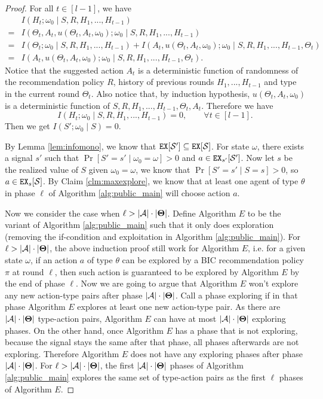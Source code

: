 \begin{proof}
For all $t \in [l-1]$, we have
\begin{align*}
&I(H_t; \omega_0\mid S,R,H_1,...,H_{t-1}) \\
=& I(\Theta_t, A_t, u(\Theta_t, A_t, \omega_0); \omega_0\mid S,R,H_1,...,H_{t-1}) \\
=& I(\Theta_t ; \omega_0\mid S,R,H_1,...,H_{t-1}) +  I(A_t, u(\Theta_t, A_t, \omega_0); \omega_0\mid S,R,H_1,...,H_{t-1},\Theta_t) \\
=& I(A_t, u(\Theta_t, A_t, \omega_0); \omega_0\mid S,R,H_1,...,H_{t-1},\Theta_t).
\end{align*}
Notice that the suggested action $A_t$ is a deterministic function of randomness of the recommendation policy $R$,  history of previous rounds $H_1,...,H_{t-1}$ and type in the current round $\Theta_t$. Also notice that, by induction hypothesis, $u(\Theta_t, A_t, \omega_0)$ is a deterministic function of $S,R,H_1,...,H_{t-1},\Theta_t, A_t$. Therefore we have
\[
I(H_t; \omega_0\mid S,R,H_1,...,H_{t-1}) = 0, \qquad \forall t \in [l-1].
\]
Then we get
$ I(S'; \omega_0 \mid  S) = 0.$

By Lemma \ref{lem:infomono}, we know that $\mathtt{EX}[\mathcal{S}'] \subseteq \mathtt{EX}[\mathcal{S}]$. For state $\omega$, there exists a signal $s'$ such that $\Pr[S'=s'\mid \omega_0 =\omega] >0 $ and $a \in \mathtt{EX}_{s'} [\mathcal{S}']$. Now let $s$ be the realized value of $S$ given $\omega_0 = \omega$, we know that $\Pr[S'=s'\mid S=s] >0$, so $a \in \mathtt{EX}_s[\mathcal{S}]$. By Claim \ref{clm:maxexplore}, we know that at least one agent of type $\theta$ in phase $\ell$ of Algorithm \ref{alg:public_main} will choose action $a$.

Now we consider the case when $\ell > |\mathcal{A}| \cdot |\bold{\Theta}|$. Define Algorithm $E$ to be the variant of Algorithm \ref{alg:public_main} such that it only does exploration (removing the if-condition and exploitation in Algorithm \ref{alg:public_main}). For $\ell > |\mathcal{A}| \cdot |\bold{\Theta}|$, the above induction proof still work for Algorithm $E$, i.e. for a given state $\omega$, if an action $a$ of type $\theta$ can be explored by a BIC recommendation policy $\pi$ at round $\ell$, then such action is guaranteed to be explored by Algorithm $E$ by the end of phase $\ell$. Now we are going to argue that Algorithm $E$ won't explore any new action-type pairs after phase $|\mathcal{A}| \cdot |\bold{\Theta}|$. Call a phase exploring if in that phase Algorithm $E$ explores at least one new action-type pair. As there are  $ |\mathcal{A}| \cdot |\bold{\Theta}|$ type-action pairs, Algorithm $E$ can have at most $ |\mathcal{A}| \cdot |\bold{\Theta}|$ exploring phases. On the other hand, once Algorithm $E$ has a phase that is not exploring, because the signal stays the same after that phase, all phases afterwards are not exploring. Therefore Algorithm $E$ does not have any exploring phases after phase $|\mathcal{A}| \cdot |\bold{\Theta}|$. For $\ell > |\mathcal{A}| \cdot |\bold{\Theta}|$, the first $|   \mathcal{A}| \cdot |\bold{\Theta}|$ phases of Algorithm \ref{alg:public_main} explores the same set of type-action pairs as the first $\ell$ phases of Algorithm $E$.
\end{proof}

